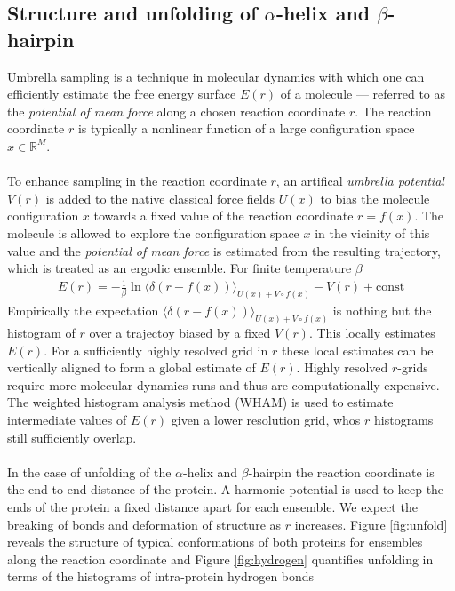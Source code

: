 \documentclass{article}[12pt]
\numberwithin{equation}{section}
\begin{document}
\subsection{Structure and unfolding of $\alpha$-helix and $\beta$-hairpin}
Umbrella sampling is a technique in molecular dynamics with which one can
efficiently estimate the free energy surface $E(r)$ of a molecule --- referred to as the
\textit{potential of mean force} along a chosen reaction coordinate $r$. The
reaction coordinate $r$ is typically a nonlinear function of a large configuration
space $x\in\mathbb{R}^M$.
\\\\
To enhance sampling in the reaction coordinate $r$, an artifical \textit{umbrella
potential} $V(r)$ is added to the native classical force fields $U(x)$ to bias the molecule
configuration $x$ towards a fixed value of the reaction coordinate $r=f(x)$.
The molecule is allowed to explore the configuration space $x$ in the vicinity of
this value and the \textit{potential of mean force} is estimated from the resulting
trajectory, which is treated as an ergodic ensemble. For finite temperature $\beta$
\begin{align}
	E(r)= -\frac{1}{\beta}\ln\big\langle
	\delta\left(r-f(x)\right)
	\big\rangle_{U(x)+V\circ f(x)}
		-V(r)
		+\mathrm{const}
\end{align}
Empirically the expectation $\langle\delta\left(r-f(x)\right)\rangle_{U(x)+V\circ f(x)}$
is nothing but the histogram of $r$ over a trajectoy biased by a fixed $V(r)$. This
locally estimates $E(r)$. For a sufficiently highly resolved grid in $r$ these
local estimates can be vertically aligned to form a global estimate of $E(r)$.
Highly resolved $r$-grids require more molecular dynamics runs and thus
are computationally expensive. The weighted histogram analysis method (WHAM)
is used to estimate intermediate values of $E(r)$ given a lower resolution grid,
whos $r$ histograms still sufficiently overlap.
\\\\
In the case of unfolding of the $\alpha$-helix and $\beta$-hairpin
the reaction coordinate is the end-to-end distance of the protein. A harmonic
potential is used to keep the ends of the protein a fixed distance apart for
each ensemble. We expect the breaking of bonds and deformation of structure
as $r$ increases.
Figure \ref{fig:unfold} reveals the structure of typical conformations of both
proteins for ensembles along the reaction coordinate and Figure \ref{fig:hydrogen}
quantifies unfolding in terms of the histograms of intra-protein hydrogen bonds
\end{document}
